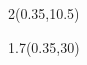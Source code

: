 \begin{textblock*}{2\TPHorizModule}(0.35\TPHorizModule,10.5\TPVertModule)
  \affiliation
\end{textblock*}

\begin{textblock*}{1.7\TPHorizModule}(0.35\TPHorizModule,30\TPVertModule)
  \edition
\end{textblock*}
\endgroup

